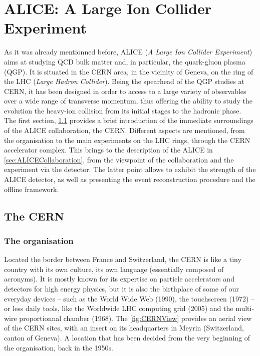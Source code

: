 \newpage
\chapter{ALICE: A Large Ion Collider Experiment}
\label{chap:ALICE}

As it was already mentionned before, ALICE (\textit{A Large Ion Collider Experiment})  aims at studying QCD bulk matter and, in particular, the quark-gluon plasma (QGP). It is situated in the CERN area, in the vicinity of Geneva, on the ring of the LHC (\textit{Large Hadron Collider}). Being the spearhead of the QGP studies at CERN, it has been designed in order to access to a large variety of observables over a wide range of transverse momentum, thus offering the ability to study the evolution the heavy-ion collision from its initial stages to the hadronic phase.\\

The first section, \Sec\ref{sec:CERN} provides a brief introduction of the immediate surroundings of the ALICE collaboration, the CERN. Different aspects are mentioned, from the organisation to the main experiments on the LHC rings, through the CERN accelerator complex. This brings to the description of the ALICE in \Sec\ref{sec:ALICECollaboration}, from the viewpoint of the collaboration and the experiment via the detector. The latter point allows to exhibit the strength of the ALICE detector, as well as presenting the event reconstruction procedure and the offline framework.


\section{The CERN}
\label{sec:CERN}

\subsection{The organisation}

Located the border between France and Switzerland, the CERN is like a tiny country with its own culture, its own language (essentially composed of acronyms). It is mostly known for its expertise on particle accelerators and detectors for high energy physics, but it is also the birthplace of some of our everyday devices -- such as the World Wide Web (1990), the touchscreen (1972) -- or less daily tools, like the Worldwide LHC computing grid (2005) and the multi-wire proportionnal chamber (1968). The \fig\ref{fig:CERNView} provides an aerial view of the CERN sites, with an insert on its headquarters in Meyrin (Switzerland, canton of Geneva). A location that has been decided from the very beginning of the organisation, back in the 1950s.\\

